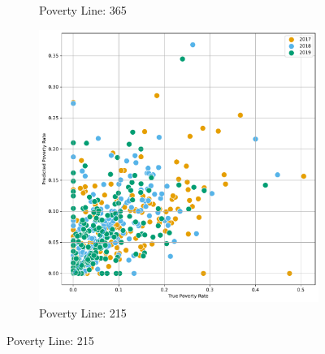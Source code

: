 \begin{figure}[H]
\begin{subfigure}[b]{0.47\textwidth}
             \caption{Poverty Line: 365}
         \end{subfigure} 
          \hfill
         \begin{subfigure}[b]{0.47\textwidth}
             \centering
             \includegraphics[width=\textwidth]{../figures/fig4_2_prediction_vs_true_poverty_rate_provincia_p215_scatter.pdf}
             \caption{Poverty Line: 215}
         \end{subfigure} 
\end{figure}



